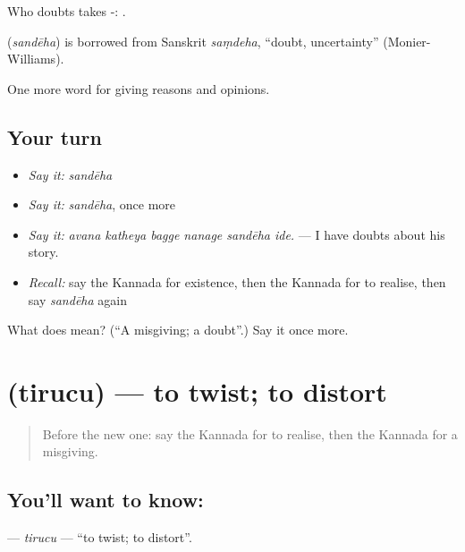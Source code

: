 Who doubts takes -:   .

\begin{cousinweb}
\textbf{} (\emph{sandēha}) is borrowed from Sanskrit \emph{saṃdeha}, \textquotedblleft{}doubt, uncertainty\textquotedblright{} (Monier-Williams).
\end{cousinweb}

\begin{grammarlens}[title={What you've built}]
One more word for giving reasons and opinions.
\end{grammarlens}

\subsection*{Your turn}
\begin{itemize}
\raggedright
  \item \emph{Say it:} \emph{sandēha}
  \item \emph{Say it:} \emph{sandēha}, once more
  \item \emph{Say it:} \emph{avana katheya bagge nanage sandēha ide.} — I have doubts about his story.
  \item \emph{Recall:} say the Kannada for existence, then the Kannada for to realise, then say \emph{sandēha} again
\end{itemize}

\begin{tcolorbox}[breakable,colback=teal!4,colframe=teal!35!black,title={Before you move on}]
What does  mean? (\textquotedblleft{}A misgiving; a doubt\textquotedblright{}.) Say it once more.
\end{tcolorbox}
\section[\texorpdfstring{\kn{ತಿರುಚು} (tirucu)}{ತಿರುಚು (tirucu)}]{ (tirucu) — to twist; to distort}

\label{lesson:KA-C383-tirucu}



\begin{quote}
Before the new one: say the Kannada for to realise, then the Kannada for a misgiving.
\end{quote}

\subsection*{You'll want to know: }
\textbf{} — \emph{tirucu} — \textquotedblleft{}to twist; to distort\textquotedblright{}.

